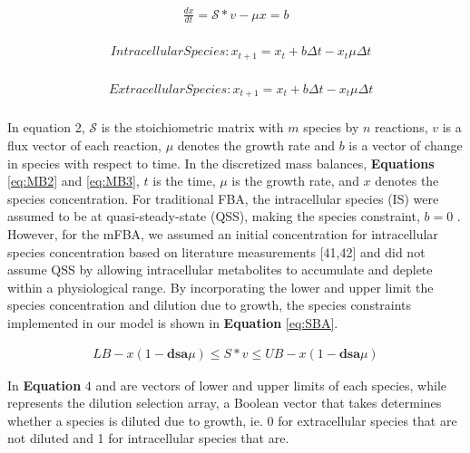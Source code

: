 \documentclass[12pt]{article}
\begin{document}
\begin{equation}\label{eq:MB1}
\begin{aligned}
\frac{dx}{dt}= \mathcal{S}* v- \mu x=b \\
\end{aligned}
\end{equation}

\begin{equation}\label{eq:MB2}
\begin{aligned}
&Intracellular Species: x_{t+1} = x_t + b\Delta t - x_t \mu \Delta t\\
\end{aligned}
\end{equation}

\begin{equation}\label{eq:MB3}
\begin{aligned}
&Extracellular Species: x_{t+1} = x_t + b\Delta t - x_t \mu \Delta t\\
\end{aligned}
\end{equation}



In equation 2, $\mathcal{S}$ is the stoichiometric matrix with $m$ species by $n$ reactions, $v$ is a flux vector of each reaction, $\mu$ denotes the growth rate and $b$ is a vector of change in species with respect to time. In the discretized mass balances, \textbf{Equations} \eqref{eq:MB2} and \eqref{eq:MB3}, $t$ is the time, $\mu$ is the growth rate, and $x$ denotes the species concentration. For traditional FBA, the intracellular species (IS) were assumed to be at quasi-steady-state (QSS), making the species constraint, $b=0$ . However, for the mFBA, we assumed an initial concentration for intracellular species concentration based on literature measurements [41,42] and did not assume QSS by allowing intracellular metabolites to accumulate and deplete within a physiological range. By incorporating the lower and upper limit the species concentration and dilution due to growth, the species constraints implemented in our model is shown in \textbf{Equation} \eqref{eq:SBA}. 

\begin{equation}\label{eq:SBA}
\begin{aligned}
LB - x(1-\mathbf{dsa}\mu)\le S*v \le UB - x(1-\mathbf{dsa}\mu)
\end{aligned}
\end{equation}

In \textbf{Equation} 4  and  are vectors of lower and upper limits of each species, while  represents the dilution selection array, a Boolean vector that takes determines whether a species is diluted due to growth, ie. 0 for extracellular species that are not diluted and 1 for intracellular species that are.
\end{document}
